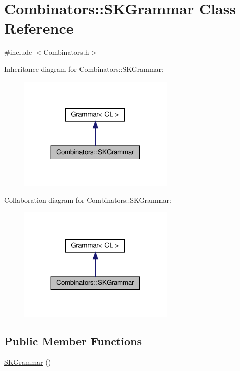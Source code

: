\hypertarget{class_combinators_1_1_s_k_grammar}{}\section{Combinators\+:\+:S\+K\+Grammar Class Reference}
\label{class_combinators_1_1_s_k_grammar}


{\ttfamily \#include $<$Combinators.\+h$>$}



Inheritance diagram for Combinators\+:\+:S\+K\+Grammar\+:\nopagebreak
\begin{figure}[H]
\begin{center}
\leavevmode
\includegraphics[width=212pt]{class_combinators_1_1_s_k_grammar__inherit__graph}
\end{center}
\end{figure}


Collaboration diagram for Combinators\+:\+:S\+K\+Grammar\+:\nopagebreak
\begin{figure}[H]
\begin{center}
\leavevmode
\includegraphics[width=212pt]{class_combinators_1_1_s_k_grammar__coll__graph}
\end{center}
\end{figure}
\subsection*{Public Member Functions}
\begin{DoxyCompactItemize}
\item 
\hyperlink{class_combinators_1_1_s_k_grammar_a6bdc75326a1d81758bb23036de2819f0}{S\+K\+Grammar} ()
\end{DoxyCompactItemize}
